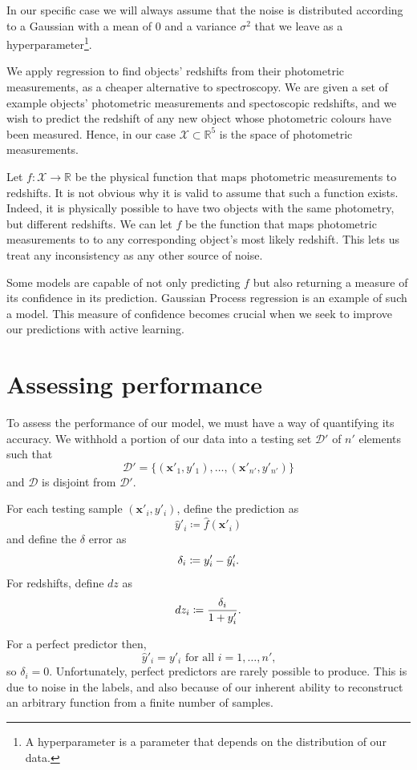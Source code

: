 \documentclass[11pt,twoside]{report}
\newcommand\bx{\mathbf{x}}
\newcommand\bbR{\mathbb{R}}
\newcommand\cD{\mathcal{D}}
\newcommand\cX{\mathcal{X}}
\begin{document}
In our specific case we will always assume that the noise is distributed according to a Gaussian with a mean of $0$ and a variance $\sigma^2$ that we leave as a hyperparameter\footnote{A hyperparameter is a parameter that depends on the distribution of our data.}.

We apply regression to find objects' redshifts from their photometric measurements, as a cheaper alternative to spectroscopy. We are given a set of example objects' photometric measurements and spectoscopic redshifts, and we wish to predict the redshift of any new object whose photometric colours have been measured. Hence, in our case $\cX \subset \bbR^5$ is the space of photometric measurements.

Let $f : \cX \to \bbR$ be the physical function that maps photometric measurements to redshifts. It is not obvious why it is valid to assume that such a function exists. Indeed, it is physically possible to have two objects with the same photometry, but different redshifts. We can let $f$ be the function that maps photometric measurements to to any corresponding object's most likely redshift. This lets us treat any inconsistency as any other source of noise.

Some models are capable of not only predicting $f$ but also returning a measure of its confidence in its prediction. Gaussian Process regression is an example of such a model. This measure of confidence becomes crucial when we seek to improve our predictions with active learning.

\section{Assessing performance}

To assess the performance of our model, we must have a way of quantifying its accuracy. We withhold a portion of our data into a testing set $\cD'$ of $n'$ elements such that \[
  \cD' = \{(\bx'_1, y'_1), \dots, (\bx'_{n'}, y'_{n'})\}
\] and $\cD$ is disjoint from $\cD'$.

For each testing sample $(\bx'_i, y'_i)$, define the prediction as\[
  \hat y'_i \coloneqq \hat f(\bx'_i)
\] and define the $\delta$ error as \[
  \delta_i \coloneqq y'_i - \hat y'_i\text.
\] For redshifts, define $dz$ as \[
  dz_i \coloneqq \frac{\delta_i}{1 + y'_i} \text.
\]

For a perfect predictor then,\[
  \hat y'_i = y'_i \text{ for all }i=1, \dots, n'\text{,}
\] so $\delta_i = 0$. Unfortunately, perfect predictors are rarely possible to produce. This is due to noise in the labels, and also because of our inherent ability to reconstruct an arbitrary function from a finite number of samples.
\end{document}
